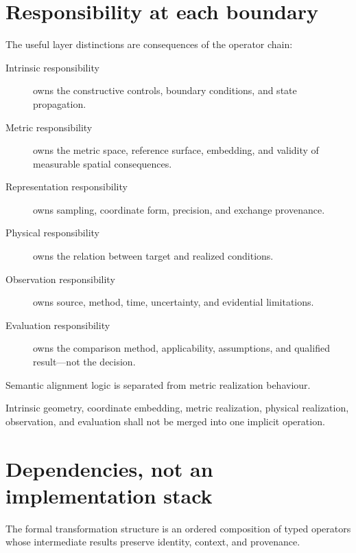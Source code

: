 \section{Responsibility at each boundary}

The useful layer distinctions are consequences of the operator chain:

\begin{description}
\item[Intrinsic responsibility] owns the constructive controls,
  boundary conditions, and state propagation.
\item[Metric responsibility] owns the metric space, reference surface,
  embedding, and validity of measurable spatial consequences.
\item[Representation responsibility] owns sampling, coordinate form,
  precision, and exchange provenance.
\item[Physical responsibility] owns the relation between target and
  realized conditions.
\item[Observation responsibility] owns source, method, time,
  uncertainty, and evidential limitations.
\item[Evaluation responsibility] owns the comparison method,
  applicability, assumptions, and qualified result---not the decision.
\end{description}

\begin{principle}
\label{princ:metric-realization-layer}
Semantic alignment logic is separated from metric realization behaviour.
\end{principle}

\begin{principle}
\label{princ:canonical-layer-separation}
Intrinsic geometry, coordinate embedding, metric realization, physical
realization, observation, and evaluation shall not be merged into one
implicit operation.
\end{principle}

\section{Dependencies, not an implementation stack}

\begin{definition}
\label{def:canonical-transformation-structure}
The formal transformation structure is an ordered composition of typed
operators whose intermediate results preserve identity, context, and
provenance.
\end{definition}

